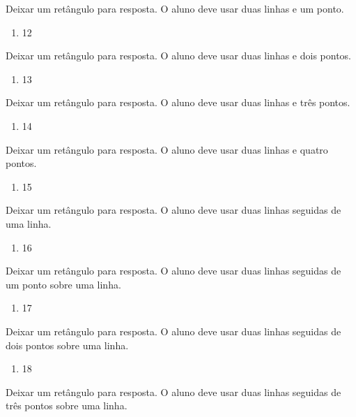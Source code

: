 \begin{enumerate}
Deixar um retângulo para resposta.
O aluno deve usar duas linhas e um ponto.

\begin{enumerate}
\def\labelenumi{\alph{enumi})}
\item
  12
\end{enumerate}

Deixar um retângulo para resposta.
O aluno deve usar duas linhas e dois pontos.

\begin{enumerate}
\def\labelenumi{\alph{enumi})}
\item
  13
\end{enumerate}

Deixar um retângulo para resposta.
O aluno deve usar duas linhas e três pontos.

\begin{enumerate}
\def\labelenumi{\alph{enumi})}
\item
  14
\end{enumerate}

Deixar um retângulo para resposta.
O aluno deve usar duas linhas e quatro pontos.

\begin{enumerate}
\def\labelenumi{\alph{enumi})}
\item
  15
\end{enumerate}

Deixar um retângulo para resposta.
O aluno deve usar duas linhas seguidas de uma linha.

\begin{enumerate}
\def\labelenumi{\alph{enumi})}
\item
  16
\end{enumerate}

Deixar um retângulo para resposta.
O aluno deve usar duas linhas seguidas de um ponto sobre uma linha.

\begin{enumerate}
\def\labelenumi{\alph{enumi})}
\item
  17
\end{enumerate}

Deixar um retângulo para resposta.
O aluno deve usar duas linhas seguidas de dois pontos sobre uma linha.

\begin{enumerate}
\def\labelenumi{\alph{enumi})}
\item
  18
\end{enumerate}

Deixar um retângulo para resposta.
O aluno deve usar duas linhas seguidas de três pontos sobre uma linha.


\end{enumerate}
